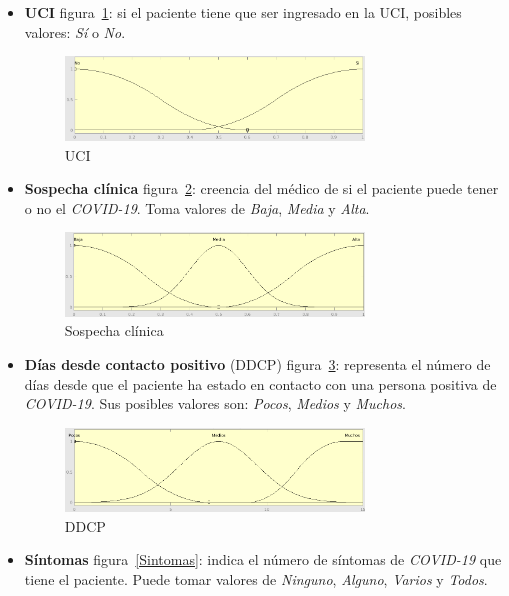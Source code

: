 \documentclass[12pt,a4paper, xcolor=table]{article}
\begin{document}
\begin{itemize}
  \item \textbf{UCI} figura~\ref{UCI}: si el paciente tiene que ser ingresado en la UCI, posibles valores: \textit{Sí} o \textit{No}.

  \begin{figure}[!h]
      \centering
      \includegraphics[width=300px]{img/UCI.png}
      \caption{UCI}
      \label{UCI}
  \end{figure}

  \item \textbf{Sospecha clínica} figura~\ref{SC}: creencia del médico de si el paciente puede tener o no el \textit{COVID-19}. Toma valores de \textit{Baja}, \textit{Media} y \textit{Alta}.

  \begin{figure}[!h]
      \centering
      \includegraphics[width=300px]{img/sospecha_clinica.png}
      \caption{Sospecha clínica}
      \label{SC}
  \end{figure}

  \item \textbf{Días desde contacto positivo} (DDCP) figura~\ref{DDCP}: representa el número de días desde que el paciente ha estado en contacto con una persona positiva de \textit{COVID-19}. Sus posibles valores son: \textit{Pocos}, \textit{Medios} y \textit{Muchos}.

  \begin{figure}[!h]
      \centering
      \includegraphics[width=300px]{img/dias_desde_cntcto_positivo.png}
      \caption{DDCP}
      \label{DDCP}
  \end{figure}

  \item \textbf{Síntomas} figura~\ref{Sintomas}: indica el número de síntomas de \textit{COVID-19} que tiene el paciente. Puede tomar valores de \textit{Ninguno}, \textit{Alguno}, \textit{Varios} y \textit{Todos}.


\end{itemize}
\end{document}
